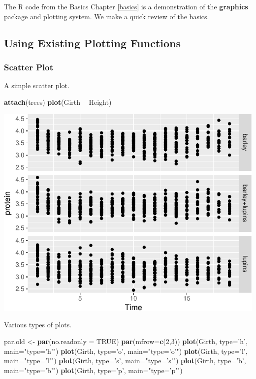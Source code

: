 \documentclass[]{book}
\newenvironment{Shaded}{\begin{snugshade}}{\end{snugshade}}
\newcommand{\DataTypeTok}[1]{\textcolor[rgb]{0.13,0.29,0.53}{#1}}
\newcommand{\DecValTok}[1]{\textcolor[rgb]{0.00,0.00,0.81}{#1}}
\newcommand{\KeywordTok}[1]{\textcolor[rgb]{0.13,0.29,0.53}{\textbf{#1}}}
\newcommand{\NormalTok}[1]{#1}
\newcommand{\OperatorTok}[1]{\textcolor[rgb]{0.81,0.36,0.00}{\textbf{#1}}}
\newcommand{\OtherTok}[1]{\textcolor[rgb]{0.56,0.35,0.01}{#1}}
\newcommand{\StringTok}[1]{\textcolor[rgb]{0.31,0.60,0.02}{#1}}
\theoremstyle{definition}
\theoremstyle{definition}
\theoremstyle{definition}
\theoremstyle{remark}
\begin{document}
The R code from the Basics Chapter \ref{basics} is a demonstration of the \textbf{graphics} package and plotting system.
We make a quick review of the basics.

\hypertarget{using-existing-plotting-functions}{%
\subsection{Using Existing Plotting Functions}\label{using-existing-plotting-functions}}

\hypertarget{scatter-plot}{%
\subsubsection{Scatter Plot}\label{scatter-plot}}

A simple scatter plot.

\begin{Shaded}
\begin{Highlighting}[]
\KeywordTok{attach}\NormalTok{(trees)}
\KeywordTok{plot}\NormalTok{(Girth }\OperatorTok{~}\StringTok{ }\NormalTok{Height)}
\end{Highlighting}
\end{Shaded}

\includegraphics[width=0.5\linewidth]{Rcourse_files/figure-latex/unnamed-chunk-246-1}

Various types of plots.

\begin{Shaded}
\begin{Highlighting}[]
\NormalTok{par.old <-}\StringTok{ }\KeywordTok{par}\NormalTok{(}\DataTypeTok{no.readonly =} \OtherTok{TRUE}\NormalTok{)}
\KeywordTok{par}\NormalTok{(}\DataTypeTok{mfrow=}\KeywordTok{c}\NormalTok{(}\DecValTok{2}\NormalTok{,}\DecValTok{3}\NormalTok{))}
\KeywordTok{plot}\NormalTok{(Girth, }\DataTypeTok{type=}\StringTok{'h'}\NormalTok{, }\DataTypeTok{main=}\StringTok{"type='h'"}\NormalTok{) }
\KeywordTok{plot}\NormalTok{(Girth, }\DataTypeTok{type=}\StringTok{'o'}\NormalTok{, }\DataTypeTok{main=}\StringTok{"type='o'"}\NormalTok{) }
\KeywordTok{plot}\NormalTok{(Girth, }\DataTypeTok{type=}\StringTok{'l'}\NormalTok{, }\DataTypeTok{main=}\StringTok{"type='l'"}\NormalTok{)}
\KeywordTok{plot}\NormalTok{(Girth, }\DataTypeTok{type=}\StringTok{'s'}\NormalTok{, }\DataTypeTok{main=}\StringTok{"type='s'"}\NormalTok{)}
\KeywordTok{plot}\NormalTok{(Girth, }\DataTypeTok{type=}\StringTok{'b'}\NormalTok{, }\DataTypeTok{main=}\StringTok{"type='b'"}\NormalTok{)}
\KeywordTok{plot}\NormalTok{(Girth, }\DataTypeTok{type=}\StringTok{'p'}\NormalTok{, }\DataTypeTok{main=}\StringTok{"type='p'"}\NormalTok{)}
\end{Highlighting}
\end{Shaded}
\end{document}
